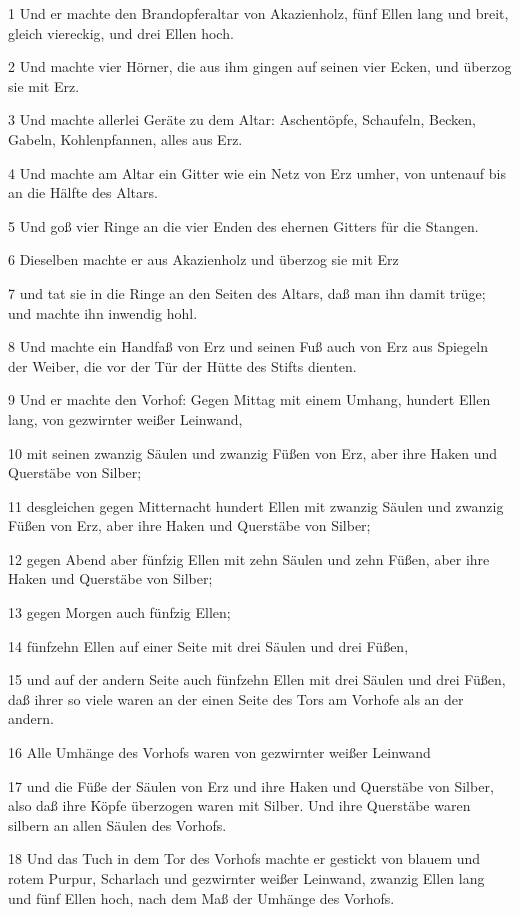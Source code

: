 \par 1 Und er machte den Brandopferaltar von Akazienholz, fünf Ellen lang und breit, gleich viereckig, und drei Ellen hoch.
\par 2 Und machte vier Hörner, die aus ihm gingen auf seinen vier Ecken, und überzog sie mit Erz.
\par 3 Und machte allerlei Geräte zu dem Altar: Aschentöpfe, Schaufeln, Becken, Gabeln, Kohlenpfannen, alles aus Erz.
\par 4 Und machte am Altar ein Gitter wie ein Netz von Erz umher, von untenauf bis an die Hälfte des Altars.
\par 5 Und goß vier Ringe an die vier Enden des ehernen Gitters für die Stangen.
\par 6 Dieselben machte er aus Akazienholz und überzog sie mit Erz
\par 7 und tat sie in die Ringe an den Seiten des Altars, daß man ihn damit trüge; und machte ihn inwendig hohl.
\par 8 Und machte ein Handfaß von Erz und seinen Fuß auch von Erz aus Spiegeln der Weiber, die vor der Tür der Hütte des Stifts dienten.
\par 9 Und er machte den Vorhof: Gegen Mittag mit einem Umhang, hundert Ellen lang, von gezwirnter weißer Leinwand,
\par 10 mit seinen zwanzig Säulen und zwanzig Füßen von Erz, aber ihre Haken und Querstäbe von Silber;
\par 11 desgleichen gegen Mitternacht hundert Ellen mit zwanzig Säulen und zwanzig Füßen von Erz, aber ihre Haken und Querstäbe von Silber;
\par 12 gegen Abend aber fünfzig Ellen mit zehn Säulen und zehn Füßen, aber ihre Haken und Querstäbe von Silber;
\par 13 gegen Morgen auch fünfzig Ellen;
\par 14 fünfzehn Ellen auf einer Seite mit drei Säulen und drei Füßen,
\par 15 und auf der andern Seite auch fünfzehn Ellen mit drei Säulen und drei Füßen, daß ihrer so viele waren an der einen Seite des Tors am Vorhofe als an der andern.
\par 16 Alle Umhänge des Vorhofs waren von gezwirnter weißer Leinwand
\par 17 und die Füße der Säulen von Erz und ihre Haken und Querstäbe von Silber, also daß ihre Köpfe überzogen waren mit Silber. Und ihre Querstäbe waren silbern an allen Säulen des Vorhofs.
\par 18 Und das Tuch in dem Tor des Vorhofs machte er gestickt von blauem und rotem Purpur, Scharlach und gezwirnter weißer Leinwand, zwanzig Ellen lang und fünf Ellen hoch, nach dem Maß der Umhänge des Vorhofs.
